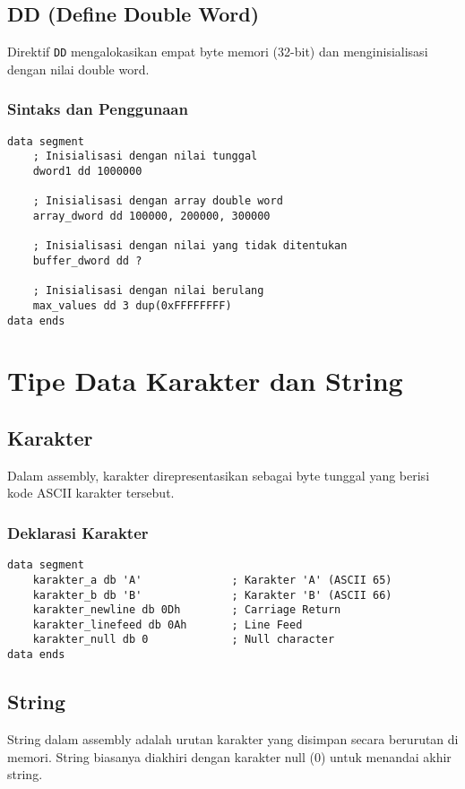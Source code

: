 \documentclass[../main.tex]{subfiles}
\begin{document}
\subsection{DD (Define Double Word)}
Direktif \texttt{DD} mengalokasikan empat byte memori (32-bit) dan menginisialisasi dengan nilai double word.

\subsubsection{Sintaks dan Penggunaan}
\begin{lstlisting}[language={[x86masm]Assembler}, caption=Contoh Penggunaan DD, label={lst:dd-examples}]
data segment
    ; Inisialisasi dengan nilai tunggal
    dword1 dd 1000000
    
    ; Inisialisasi dengan array double word
    array_dword dd 100000, 200000, 300000
    
    ; Inisialisasi dengan nilai yang tidak ditentukan
    buffer_dword dd ?
    
    ; Inisialisasi dengan nilai berulang
    max_values dd 3 dup(0xFFFFFFFF)
data ends
\end{lstlisting}

\section{Tipe Data Karakter dan String}

\subsection{Karakter}
Dalam assembly, karakter direpresentasikan sebagai byte tunggal yang berisi kode ASCII karakter tersebut.

\subsubsection{Deklarasi Karakter}
\begin{lstlisting}[language={[x86masm]Assembler}, caption=Deklarasi Karakter, label={lst:character-declaration}]
data segment
    karakter_a db 'A'              ; Karakter 'A' (ASCII 65)
    karakter_b db 'B'              ; Karakter 'B' (ASCII 66)
    karakter_newline db 0Dh        ; Carriage Return
    karakter_linefeed db 0Ah       ; Line Feed
    karakter_null db 0             ; Null character
data ends
\end{lstlisting}

\subsection{String}
String dalam assembly adalah urutan karakter yang disimpan secara berurutan di memori. String biasanya diakhiri dengan karakter null (0) untuk menandai akhir string.
\end{document}
